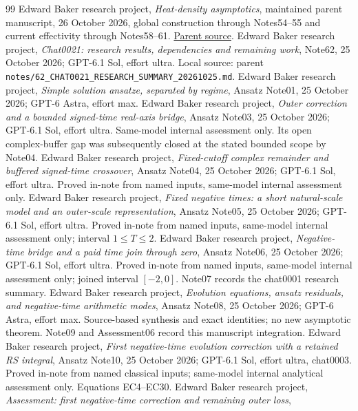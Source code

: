 \documentclass[11pt]{article}
\numberwithin{equation}{section}
\begin{document}
\begin{thebibliography}{99}
 Edward Baker research project,
\emph{Heat-density asymptotics}, maintained parent manuscript,
26 October 2026, global construction through Notes54--55 and
current effectivity through Notes58--61.
\href{../../../papers/investigations-5/01_heat_density_asymptotics/manuscript/main.tex}{Parent source}.
 Edward Baker research project,
\emph{Chat0021: research results, dependencies and remaining work},
Note62, 25 October 2026; GPT-6.1 Sol, effort ultra.
Local source: parent \texttt{notes/62\_CHAT0021\_RESEARCH\_SUMMARY\_20261025.md}.
 Edward Baker research project,
\emph{Simple solution ansatze, separated by regime},
Ansatz Note01, 25 October 2026; GPT-6 Astra, effort max.
 Edward Baker research project,
\emph{Outer correction and a bounded signed-time real-axis bridge},
Ansatz Note03, 25 October 2026; GPT-6.1 Sol, effort ultra.
Same-model internal assessment only. Its open complex-buffer gap
was subsequently closed at the stated bounded scope by Note04.
 Edward Baker research project,
\emph{Fixed-cutoff complex remainder and buffered signed-time crossover},
Ansatz Note04, 25 October 2026; GPT-6.1 Sol, effort ultra.
Proved in-note from named inputs, same-model internal assessment only.
 Edward Baker research project,
\emph{Fixed negative times: a short natural-scale model and an
outer-scale representation}, Ansatz Note05, 25 October 2026;
GPT-6.1 Sol, effort ultra. Proved in-note from named inputs,
same-model internal assessment only; interval \(1\le T\le2\).
 Edward Baker research project,
\emph{Negative-time bridge and a paid time join through zero},
Ansatz Note06, 25 October 2026; GPT-6.1 Sol, effort ultra.
Proved in-note from named inputs, same-model internal assessment only;
joined interval \([-2,0]\). Note07 records the chat0001 research summary.
 Edward Baker research project,
\emph{Evolution equations, ansatz residuals, and negative-time arithmetic modes},
Ansatz Note08, 25 October 2026; GPT-6 Astra, effort max.
Source-based synthesis and exact identities; no new asymptotic theorem.
Note09 and Assessment06 record this manuscript integration.
 Edward Baker research project,
\emph{First negative-time evolution correction with a retained RS integral},
Ansatz Note10, 25 October 2026; GPT-6.1 Sol, effort ultra, chat0003.
Proved in-note from named classical inputs; same-model internal
analytical assessment only. Equations EC4--EC30.
 Edward Baker research project,
\emph{Assessment: first negative-time correction and remaining outer loss},

\end{thebibliography}
\end{document}
